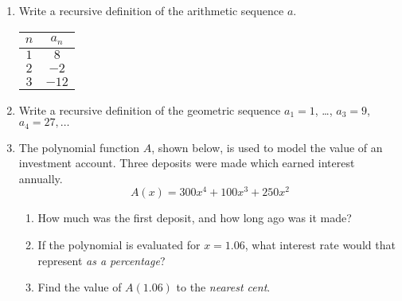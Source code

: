 \documentclass[12pt, twoside]{article}
\begin{document}
\begin{enumerate}
\item Write a recursive definition of the arithmetic sequence $a$. \\[0.5cm]
\renewcommand{\arraystretch}{1.5}
\begin{tabular}{|c|c|}
\hline
$n$ & $a_n$ \\
\hline
$1$ & $8$ \\
$2$ & $-2$ \\
$3$ & $-12$ \\
\hline
\end{tabular}

\item Write a recursive definition of the geometric sequence $a_1 = 1$, \ldots, $a_3 = 9$, $a_4 = 27, \ldots$  \vspace{3cm}

\item The polynomial function $A$, shown below, is used to model the value of an investment account. Three deposits were made which earned interest annually.  $$A(x)=300x^4+100x^3+250x^2$$ 
    \begin{enumerate}[itemsep=1cm]
        \item How much was the first deposit, and how long ago was it made? \vspace{1cm}
        \item If the polynomial is evaluated for $x = 1.06$, what interest rate would that represent \emph{as a percentage}?
        \item Find the value of $A(1.06)$ to the \emph{nearest cent}. \vspace{2cm}
    \end{enumerate}

\end{enumerate}
\end{document}
